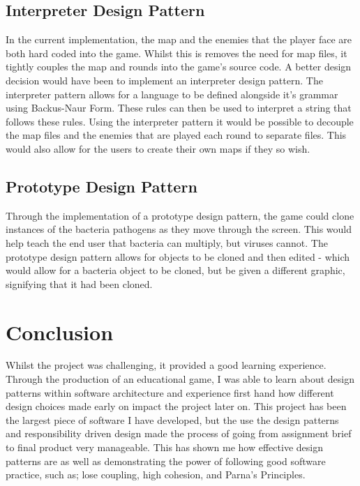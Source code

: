 \documentclass[a4paper,12pt]{article}
\begin{document}
\subsection*{Interpreter Design Pattern}
In the current implementation, the map and the enemies that the player face are both hard coded into the game. Whilst this is removes the need for map files, it tightly couples the map and rounds into the game's source code. A better design decision would have been to implement an interpreter design pattern. The interpreter pattern allows for a language to be defined alongside it's grammar using Backus-Naur Form\cite{GoF-Book}. These rules can then be used to interpret a string that follows these rules. Using the interpreter pattern it would be possible to decouple the map files and the enemies that are played each round to separate files. This would also allow for the users to create their own maps if they so wish. 

\subsection*{Prototype Design Pattern}
Through the implementation of a prototype design pattern, the game could clone instances of the bacteria pathogens as they move through the screen. This would help teach the end user that bacteria can multiply, but viruses cannot. The prototype design pattern allows for objects to be cloned and then edited\cite{GoF-Book} - which would allow for a bacteria object to be cloned, but be given a different graphic, signifying that it had been cloned. 

\section*{Conclusion}
Whilst the project was challenging, it provided a good learning experience. Through the production of an educational game, I was able to learn about design patterns within software architecture and experience first hand how different design choices made early on impact the project later on. 
This project has been the largest piece of software I have developed, but the use the design patterns and responsibility driven design made the process of going from assignment brief to final product very manageable. This has shown me how effective design patterns are as well as demonstrating the power of following good software practice, such as; lose coupling, high cohesion, and Parna's Principles. 
\end{document}

